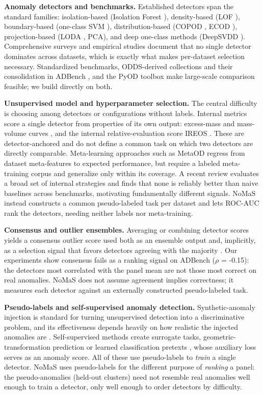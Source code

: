 \documentclass[3p,twocolumn]{elsarticle}
\begin{document}
\textbf{Anomaly detectors and benchmarks.} Established detectors span the standard families: isolation-based (Isolation Forest \cite{ref8}), density-based (LOF \cite{ref9}), boundary-based (one-class SVM \cite{ref10}), distribution-based (COPOD \cite{ref11}, ECOD \cite{ref12}), projection-based (LODA \cite{ref13}, PCA), and deep one-class methods (DeepSVDD \cite{ref14}). Comprehensive surveys \cite{ref15} and empirical studies \cite{ref16} document that no single detector dominates across datasets, which is exactly what makes per-dataset selection necessary. Standardized benchmarks, ODDS-derived collections and their consolidation in ADBench \cite{ref5}, and the PyOD toolbox \cite{ref6} make large-scale comparison feasible; we build directly on both.

\textbf{Unsupervised model and hyperparameter selection.} The central difficulty is choosing among detectors or configurations without labels. Internal metrics score a single detector from properties of its own output: excess-mass and mass-volume curves \cite{ref1}, and the internal relative-evaluation score IREOS \cite{ref2}. These are detector-anchored and do not define a common task on which two detectors are directly comparable. Meta-learning approaches such as MetaOD \cite{ref3} regress from dataset meta-features to expected performance, but require a labeled meta-training corpus and generalize only within its coverage. A recent review \cite{ref17} evaluates a broad set of internal strategies and finds that none is reliably better than naive baselines across benchmarks, motivating fundamentally different signals. NoMaS instead constructs a common pseudo-labeled task per dataset and lets ROC-AUC rank the detectors, needing neither labels nor meta-training.

\textbf{Consensus and outlier ensembles.} Averaging or combining detector scores yields a consensus outlier score used both as an ensemble output and, implicitly, as a selection signal that favors detectors agreeing with the majority \cite{ref4, ref18}. Our experiments show consensus fails as a ranking signal on ADBench ($\rho$ = -0.15): the detectors most correlated with the panel mean are not those most correct on real anomalies. NoMaS does not assume agreement implies correctness; it measures each detector against an externally constructed pseudo-labeled task.

\textbf{Pseudo-labels and self-supervised anomaly detection.} Synthetic-anomaly injection is standard for turning unsupervised detection into a discriminative problem, and its effectiveness depends heavily on how realistic the injected anomalies are \cite{ref7}. Self-supervised methods create surrogate tasks, geometric-transformation prediction \cite{ref19} or learned classification pretexts \cite{ref20}, whose auxiliary loss serves as an anomaly score. All of these use pseudo-labels to \emph{train} a single detector. NoMaS uses pseudo-labels for the different purpose of \emph{ranking} a panel: the pseudo-anomalies (held-out clusters) need not resemble real anomalies well enough to train a detector, only well enough to order detectors by difficulty.
\end{document}
